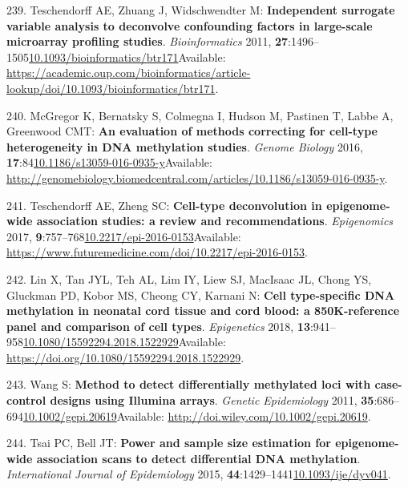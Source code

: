 \documentclass[
]{book}
\begin{document}
\leavevmode\hypertarget{ref-Teschendorff2011}{}%
239. Teschendorff AE, Zhuang J, Widschwendter M: \textbf{Independent surrogate variable analysis to deconvolve confounding factors in large-scale microarray profiling studies}. \emph{Bioinformatics} 2011, \textbf{27}:1496--1505\href{https://doi.org/10.1093/bioinformatics/btr171}{10.1093/bioinformatics/btr171}Available: \url{https://academic.oup.com/bioinformatics/article-lookup/doi/10.1093/bioinformatics/btr171}.

\leavevmode\hypertarget{ref-McGregor2016}{}%
240. McGregor K, Bernatsky S, Colmegna I, Hudson M, Pastinen T, Labbe A, Greenwood CMT: \textbf{An evaluation of methods correcting for cell-type heterogeneity in DNA methylation studies}. \emph{Genome Biology} 2016, \textbf{17}:84\href{https://doi.org/10.1186/s13059-016-0935-y}{10.1186/s13059-016-0935-y}Available: \url{http://genomebiology.biomedcentral.com/articles/10.1186/s13059-016-0935-y}.

\leavevmode\hypertarget{ref-Teschendorff2017}{}%
241. Teschendorff AE, Zheng SC: \textbf{Cell-type deconvolution in epigenome-wide association studies: a review and recommendations}. \emph{Epigenomics} 2017, \textbf{9}:757--768\href{https://doi.org/10.2217/epi-2016-0153}{10.2217/epi-2016-0153}Available: \url{https://www.futuremedicine.com/doi/10.2217/epi-2016-0153}.

\leavevmode\hypertarget{ref-Lin2018}{}%
242. Lin X, Tan JYL, Teh AL, Lim IY, Liew SJ, MacIsaac JL, Chong YS, Gluckman PD, Kobor MS, Cheong CY, Karnani N: \textbf{Cell type-specific DNA methylation in neonatal cord tissue and cord blood: a 850K-reference panel and comparison of cell types}. \emph{Epigenetics} 2018, \textbf{13}:941--958\href{https://doi.org/10.1080/15592294.2018.1522929}{10.1080/15592294.2018.1522929}Available: \url{https://doi.org/10.1080/15592294.2018.1522929}.

\leavevmode\hypertarget{ref-Wang2011}{}%
243. Wang S: \textbf{Method to detect differentially methylated loci with case-control designs using Illumina arrays}. \emph{Genetic Epidemiology} 2011, \textbf{35}:686--694\href{https://doi.org/10.1002/gepi.20619}{10.1002/gepi.20619}Available: \url{http://doi.wiley.com/10.1002/gepi.20619}.

\leavevmode\hypertarget{ref-Tsai2015}{}%
244. Tsai PC, Bell JT: \textbf{Power and sample size estimation for epigenome-wide association scans to detect differential DNA methylation}. \emph{International Journal of Epidemiology} 2015, \textbf{44}:1429--1441\href{https://doi.org/10.1093/ije/dyv041}{10.1093/ije/dyv041}.
\end{document}
